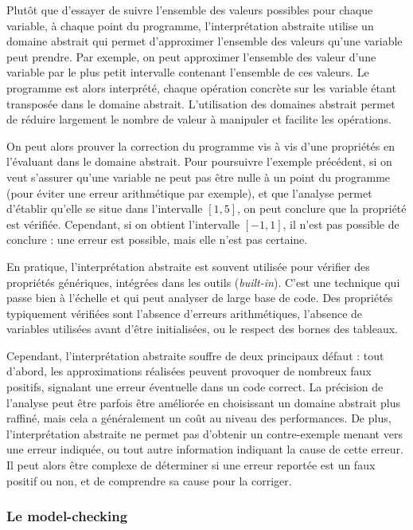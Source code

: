 Plutôt que d'essayer de suivre l'ensemble des valeurs possibles pour
chaque variable, à chaque point du programme, l'interprétation abstraite
utilise un domaine abstrait qui permet d'approximer l'ensemble des
valeurs qu'une variable peut prendre. Par exemple, on peut approximer
l'ensemble des valeur d'une variable par le plus petit intervalle
contenant l'ensemble de ces valeurs. Le programme est alors interprété,
chaque opération concrète sur les variable étant transposée dans le
domaine abstrait. L'utilisation des domaines abstrait permet de réduire
largement le nombre de valeur à manipuler et facilite les opérations.

On peut alors prouver la correction du programme vis à vis d'une
propriétés en l'évaluant dans le domaine abstrait. Pour poursuivre
l'exemple précédent, si on veut s'assurer qu'une variable ne peut pas
être nulle à un point du programme (pour éviter une erreur arithmétique
par exemple), et que l'analyse permet d'établir qu'elle se situe dans
l'intervalle \([1, 5]\), on peut conclure que la propriété est vérifiée.
Cependant, si on obtient l'intervalle \([-1, 1]\), il n'est pas possible
de conclure : une erreur est possible, mais elle n'est pas certaine.

En pratique, l'interprétation abstraite est souvent utilisée pour
vérifier des propriétés génériques, intégrées dans les outils
(\emph{built-in}). C'est une technique qui
passe bien à l'échelle et qui peut analyser de large base de code. Des
propriétés typiquement vérifiées sont l'absence d'erreurs arithmétiques,
l'absence de variables utilisées avant d'être initialisées, ou le
respect des bornes des tableaux.

Cependant, l'interprétation abstraite souffre de deux principaux défaut
: tout d'abord, les approximations réalisées peuvent provoquer de
nombreux faux positifs, signalant une erreur éventuelle dans un code
correct. La précision de l'analyse peut être parfois être améliorée en
choisissant un domaine abstrait plus raffiné, mais cela a généralement
un coût au niveau des performances. De plus, l'interprétation abstraite
ne permet pas d'obtenir un contre-exemple menant vers une erreur
indiquée, ou tout autre information indiquant la cause de cette erreur.
Il peut alors être complexe de déterminer si une erreur reportée est un
faux positif ou non, et de comprendre sa cause pour la corriger.

\subsubsection{Le model-checking}

